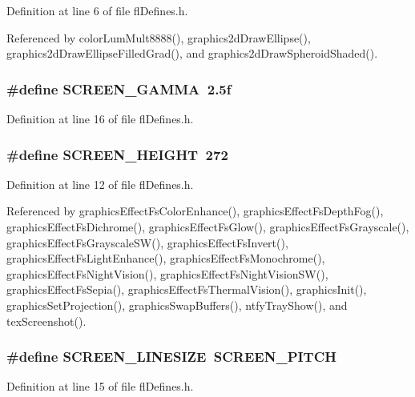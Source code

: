 Definition at line 6 of file fl\-Defines.h.

Referenced by color\-Lum\-Mult8888(), graphics2d\-Draw\-Ellipse(), graphics2d\-Draw\-Ellipse\-Filled\-Grad(), and graphics2d\-Draw\-Spheroid\-Shaded().
\subsubsection{\setlength{\rightskip}{0pt plus 5cm}\#define SCREEN\_\-GAMMA~2.5f}\label{flDefines_8h_76469cbf8aaa4092ce85470f148a6f03}




Definition at line 16 of file fl\-Defines.h.
\subsubsection{\setlength{\rightskip}{0pt plus 5cm}\#define SCREEN\_\-HEIGHT~272}\label{flDefines_8h_6974d08a74da681b3957b2fead2608b8}




Definition at line 12 of file fl\-Defines.h.

Referenced by graphics\-Effect\-Fs\-Color\-Enhance(), graphics\-Effect\-Fs\-Depth\-Fog(), graphics\-Effect\-Fs\-Dichrome(), graphics\-Effect\-Fs\-Glow(), graphics\-Effect\-Fs\-Grayscale(), graphics\-Effect\-Fs\-Grayscale\-SW(), graphics\-Effect\-Fs\-Invert(), graphics\-Effect\-Fs\-Light\-Enhance(), graphics\-Effect\-Fs\-Monochrome(), graphics\-Effect\-Fs\-Night\-Vision(), graphics\-Effect\-Fs\-Night\-Vision\-SW(), graphics\-Effect\-Fs\-Sepia(), graphics\-Effect\-Fs\-Thermal\-Vision(), graphics\-Init(), graphics\-Set\-Projection(), graphics\-Swap\-Buffers(), ntfy\-Tray\-Show(), and tex\-Screenshot().
\subsubsection{\setlength{\rightskip}{0pt plus 5cm}\#define SCREEN\_\-LINESIZE~SCREEN\_\-PITCH}\label{flDefines_8h_a74f83c08f554b83174fc5ec760c90d5}




Definition at line 15 of file fl\-Defines.h.

